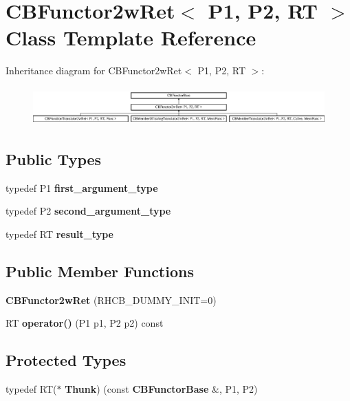 \section{C\+B\+Functor2w\+Ret$<$ P1, P2, RT $>$ Class Template Reference}
\label{classCBFunctor2wRet}
Inheritance diagram for C\+B\+Functor2w\+Ret$<$ P1, P2, RT $>$\+:\begin{figure}[H]
\begin{center}
\leavevmode
\includegraphics[height=1.485411cm]{classCBFunctor2wRet}
\end{center}
\end{figure}
\subsection*{Public Types}
\begin{DoxyCompactItemize}
\item 
typedef P1 {\bfseries first\+\_\+argument\+\_\+type}\label{classCBFunctor2wRet_a7d24bfcc6aa65aa4b55b5e959a004dd4}

\item 
typedef P2 {\bfseries second\+\_\+argument\+\_\+type}\label{classCBFunctor2wRet_ab581d0954897537b10bf2de447b8b657}

\item 
typedef RT {\bfseries result\+\_\+type}\label{classCBFunctor2wRet_a9d2ef5e7ee4eaac99bea7abfdd21af82}

\end{DoxyCompactItemize}
\subsection*{Public Member Functions}
\begin{DoxyCompactItemize}
\item 
{\bfseries C\+B\+Functor2w\+Ret} (R\+H\+C\+B\+\_\+\+D\+U\+M\+M\+Y\+\_\+\+I\+N\+IT=0)\label{classCBFunctor2wRet_a72315832a0fbc1a017d94c6d1a0744ea}

\item 
RT {\bfseries operator()} (P1 p1, P2 p2) const \label{classCBFunctor2wRet_ac6c5aa2cc0ec49461fef4031c2550121}

\end{DoxyCompactItemize}
\subsection*{Protected Types}
\begin{DoxyCompactItemize}
\item 
typedef RT($\ast$ {\bfseries Thunk}) (const {\bf C\+B\+Functor\+Base} \&, P1, P2)\label{classCBFunctor2wRet_ae2a1a21268a5beaac9acd0f08bcaee29}

\end{DoxyCompactItemize}
